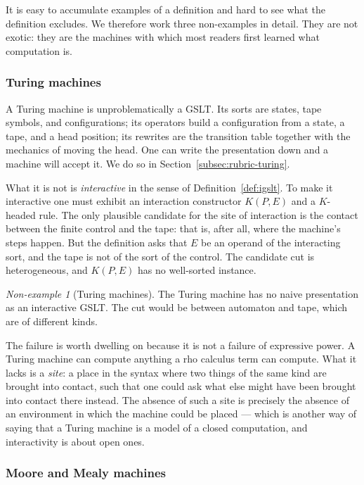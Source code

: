 \documentclass[11pt]{article}
\theoremstyle{definition}
\theoremstyle{plain}
\theoremstyle{remark}
\newtheorem{nonexample}[definition]{Non-example}
\begin{document}
It is easy to accumulate examples of a definition and hard to see what the definition
excludes. We therefore work three non-examples in detail. They are not exotic: they are
the machines with which most readers first learned what computation is.

\subsubsection{Turing machines}

A Turing machine is unproblematically a GSLT. Its sorts are states, tape symbols, and
configurations; its operators build a configuration from a state, a tape, and a head
position; its rewrites are the transition table together with the mechanics of moving
the head. One can write the presentation down and a machine will accept it. We do so in
Section~\ref{subsec:rubric-turing}.

What it is not is \emph{interactive} in the sense of Definition~\ref{def:igslt}. To make
it interactive one must exhibit an interaction constructor $K(P,E)$ and a $K$-headed
rule. The only plausible candidate for the site of interaction is the contact between
the finite control and the tape: that is, after all, where the machine's steps happen.
But the definition asks that $E$ be an operand of the interacting sort, and the tape is
not of the sort of the control. The candidate cut is heterogeneous, and $K(P,E)$ has no
well-sorted instance.

\begin{nonexample}[Turing machines]
\label{nonex:turing}
The Turing machine has no naive presentation as an interactive GSLT. The cut would be
between automaton and tape, which are of different kinds.
\end{nonexample}

The failure is worth dwelling on because it is not a failure of expressive power. A
Turing machine can compute anything a rho calculus term can compute. What it lacks is a
\emph{site}: a place in the syntax where two things of the same kind are brought into
contact, such that one could ask what else might have been brought into contact there
instead. The absence of such a site is precisely the absence of an environment in which
the machine could be placed --- which is another way of saying that a Turing machine is
a model of a closed computation, and interactivity is about open ones.

\subsubsection{Moore and Mealy machines}
\end{document}
